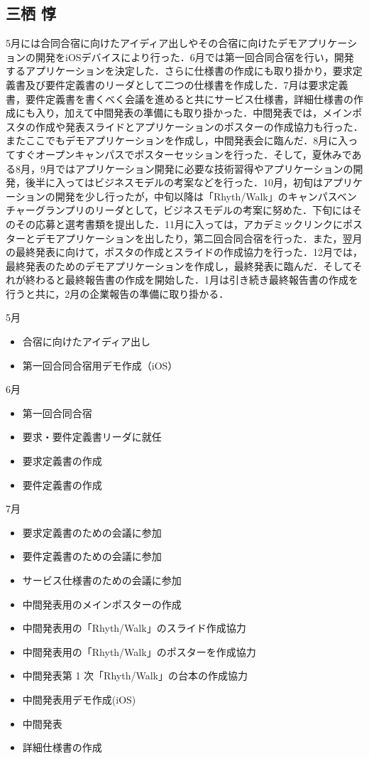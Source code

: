 \subsection{三栖 惇}
\par
5月には合同合宿に向けたアイディア出しやその合宿に向けたデモアプリケーションの開発をiOSデバイスにより行った．6月では第一回合同合宿を行い，開発するアプリケーションを決定した．さらに仕様書の作成にも取り掛かり，要求定義書及び要件定義書のリーダとして二つの仕様書を作成した．7月は要求定義書，要件定義書を書くべく会議を進めると共にサービス仕様書，詳細仕様書の作成にも入り，加えて中間発表の準備にも取り掛かった．中間発表では，メインポスタの作成や発表スライドとアプリケーションのポスターの作成協力も行った．またここでもデモアプリケーションを作成し，中間発表会に臨んだ．8月に入ってすぐオープンキャンパスでポスターセッションを行った．そして，夏休みである8月，9月ではアプリケーション開発に必要な技術習得やアプリケーションの開発，後半に入ってはビジネスモデルの考案などを行った．10月，初旬はアプリケーションの開発を少し行ったが，中旬以降は「Rhyth/Walk」のキャンパスベンチャーグランプリのリーダとして，ビジネスモデルの考案に努めた．下旬にはそのその応募と選考書類を提出した．11月に入っては，アカデミックリンクにポスターとデモアプリケーションを出したり，第二回合同合宿を行った．また，翌月の最終発表に向けて，ポスタの作成とスライドの作成協力を行った．12月では，最終発表のためのデモアプリケーションを作成し，最終発表に臨んだ．そしてそれが終わると最終報告書の作成を開始した．1月は引き続き最終報告書の作成を行うと共に，2月の企業報告の準備に取り掛かる．
\par
5月
\begin{itemize}
\item 合宿に向けたアイディア出し
\item 第一回合同合宿用デモ作成（iOS）
\end{itemize}
6月
\begin{itemize}
\item 第一回合同合宿
\item 要求・要件定義書リーダに就任
\item 要求定義書の作成
\item 要件定義書の作成
\end{itemize}
7月
\begin{itemize}
\item 要求定義書のための会議に参加
\item 要件定義書のための会議に参加
\item サービス仕様書のための会議に参加
\item 中間発表用のメインポスターの作成
\item 中間発表用の「Rhyth/Walk」のスライド作成協力
\item 中間発表用の「Rhyth/Walk」のポスターを作成協力
\item 中間発表第 1 次「Rhyth/Walk」の台本の作成協力
\item 中間発表用デモ作成(iOS)
\item 中間発表
\item 詳細仕様書の作成
\end{itemize}
